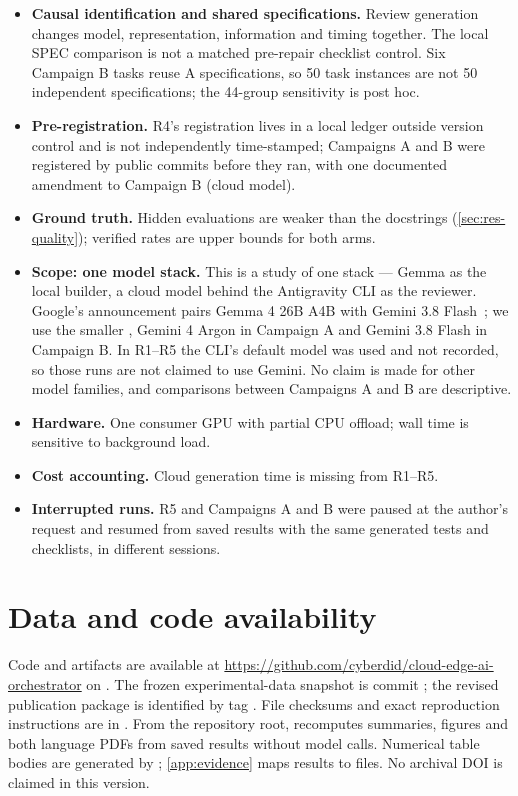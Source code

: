 \documentclass[11pt]{article}
\begin{document}
\begin{itemize}
\item \textbf{Causal identification and shared specifications.} Review generation changes model, representation, information and timing together. The local SPEC comparison is not a matched pre-repair checklist control. Six Campaign B tasks reuse A specifications, so 50 task instances are not 50 independent specifications; the 44-group sensitivity is post hoc.
\item \textbf{Pre-registration.} R4's registration lives in a local ledger outside version control and is not independently time-stamped; Campaigns A and B were registered by public commits before they ran, with one documented amendment to Campaign B (cloud model).
\item \textbf{Ground truth.} Hidden evaluations are weaker than the docstrings (\cref{sec:res-quality}); verified rates are upper bounds for both arms.
\item \textbf{Scope: one model stack.} This is a study of one stack --- Gemma as the local builder, a cloud model behind the Antigravity CLI as the reviewer. Google's announcement pairs Gemma 4 26B A4B with Gemini 3.8 Flash~\citep{kotwani2026antigravity}; we use the smaller , Gemini 4 Argon in Campaign A and Gemini 3.8 Flash in Campaign B. In R1--R5 the CLI's default model was used and not recorded, so those runs are not claimed to use Gemini. No claim is made for other model families, and comparisons between Campaigns A and B are descriptive.
\item \textbf{Hardware.} One consumer GPU with partial CPU offload; wall time is sensitive to background load.
\item \textbf{Cost accounting.} Cloud generation time is missing from R1--R5.
\item \textbf{Interrupted runs.} R5 and Campaigns A and B were paused at the author's request and resumed from saved results with the same generated tests and checklists, in different sessions.
\end{itemize}

\section{Data and code availability}\label{sec:availability}
Code and artifacts are available at \url{https://github.com/cyberdid/cloud-edge-ai-orchestrator} on . The frozen experimental-data snapshot is commit ; the revised publication package is identified by tag . File checksums and exact reproduction instructions are in . From the repository root,  recomputes summaries, figures and both language PDFs from saved results without model calls. Numerical table bodies are generated by ; \cref{app:evidence} maps results to files. No archival DOI is claimed in this version.
\end{document}
